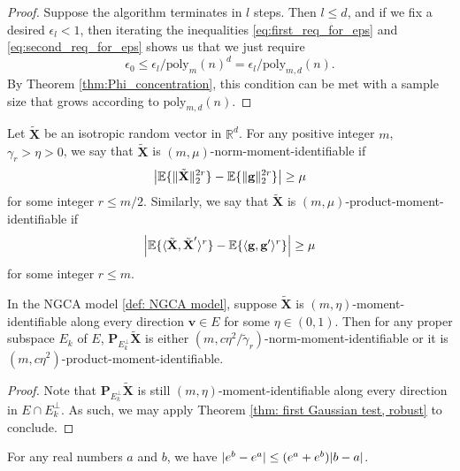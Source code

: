 \documentclass[final,12pt]{colt2018} %
\numberwithin{equation}{section}
\DeclarePairedDelimiter{\abs}{\lvert}{\rvert}
\DeclarePairedDelimiter{\norm}{\lVert}{\rVert}
\DeclarePairedDelimiter{\braces}{\lbrace}{\rbrace}
\DeclarePairedDelimiter{\inprod}{\langle}{\rangle}
\newcommand{\E}{\mathbb{E}}
\newcommand{\R}{\mathbb{R}}
\newcommand{\boldg}{\textbf{g}}
\newcommand{\boldv}{\textbf{v}}
\newcommand{\boldP}{\textbf{P}}
\newcommand{\boldX}{\textbf{X}}
\begin{document}
\begin{proof}
	Suppose the algorithm terminates in $l$ steps. Then $l \leq d$, and if we fix a desired $\epsilon_l < 1$, then iterating the inequalities \eqref{eq:first_req_for_eps} and \eqref{eq:second_req_for_eps} shows us that we just require
	\begin{equation*}
	\epsilon_0 \leq \epsilon_l/\text{poly}_m(n)^d = \epsilon_l/\text{poly}_{m,d}(n).
	\end{equation*}
	By Theorem \ref{thm:Phi_concentration}, this condition can be met with a sample size that grows according to $\text{poly}_{m,d}(n)$.
\end{proof}

\begin{definition} \label{def:norm_and_product_moment_identifiability}
	Let $\tilde{\boldX}$ be an isotropic random vector in $\R^d$. For any positive integer $m$, $\gamma_r > \eta > 0$, we say that $\tilde{\boldX}$ is $(m,\mu)$-norm-moment-identifiable if
	\begin{equation*}
	\abs*{\E\braces{\norm{\tilde{\boldX}}_2^{2r}} - \E\braces{\norm{\boldg}_2^{2r}}} \geq \mu
	\end{equation*}
	for some integer $r \leq m/2$. Similarly, we say that $\tilde{\boldX}$ is $(m,\mu)$-product-moment-identifiable if
	\begin{equation*}
	\abs*{\E\braces{\inprod{\tilde{\boldX},\tilde{\boldX}'}^{r}} - \E\braces{\inprod{\boldg,\boldg'}^r}} \geq \mu
	\end{equation*}
	for some integer $r \leq m$.
\end{definition}

\begin{lemma} \label{lem:moment_identifiability_consequence}
	In the NGCA model \eqref{def: NGCA model}, suppose $\tilde{\boldX}$ is $(m,\eta)$-moment-identifiable along every direction $\boldv \in E$ for some $\eta \in (0,1)$. Then for any proper subspace $E_k$ of $E$, $\boldP_{E_k^\perp}\tilde{\boldX}$ is either $(m,c\eta^2/\tilde{\gamma}_r)$-norm-moment-identifiable or it is $(m,c\eta^2)$-product-moment-identifiable.
\end{lemma}

\begin{proof}
	Note that $\boldP_{E_k^\perp}\tilde{\boldX}$ is still $(m,\eta)$-moment-identifiable along every direction in $E\cap E_k^\perp$. As such, we may apply Theorem \ref{thm: first Gaussian test, robust} to conclude.
\end{proof}

\begin{lemma} \label{lem:difference_of_exponentials}
	For any real numbers $a$ and $b$, we have $\abs{e^b-e^a} \leq (e^a+e^b) \abs{b-a}$.
\end{lemma}
\end{document}
